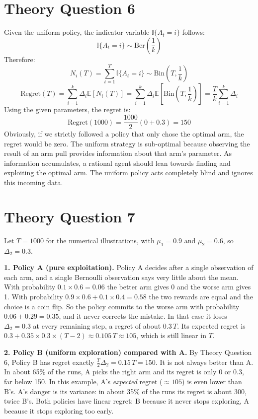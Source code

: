 \documentclass[12pt,a4paper]{article}
\begin{document}
\section*{Theory Question 6} %
Given the uniform policy, the indicator variable $\mathbb{I}\{A_t = i\}$ follows: %
\[
\mathbb{I}\{A_t = i\} \sim \mathrm{Ber}\left(\frac{1}{k}\right)
\] %
Therefore: %
\[
N_i(T) = \sum_{t=1}^T \mathbb{I}\{A_t = i\} \sim \mathrm{Bin}\left(T, \frac{1}{k}\right)
\] %
\[
\mathrm{Regret}(T) = \sum_{i=1}^k \Delta_i \mathbb{E}[N_i(T)] = \sum_{i=1}^k \Delta_i \mathbb{E}\left[\mathrm{Bin}\left(T, \frac{1}{k}\right)\right] = \frac{T}{k} \sum_{i=1}^k \Delta_i
\] %
Using the given parameters, the regret is: %
\[
\mathrm{Regret}(1000) = \frac{1000}{2} (0 + 0.3) = 150
\] %
Obviously, if we strictly followed a policy that only chose the optimal arm, the regret would be zero.
The uniform strategy is sub-optimal because observing the result of an arm pull provides information about that arm's parameter.
As information accumulates, a rational agent should lean towards finding and exploiting the optimal arm.
The uniform policy acts completely blind and ignores this incoming data.
%

\section*{Theory Question 7} %
Let $T=1000$ for the numerical illustrations, with $\mu_1 = 0.9$ and $\mu_2 = 0.6$, so $\Delta_2 = 0.3$.

\textbf{1. Policy A (pure exploitation).}
Policy A decides after a single observation of each arm, and a single Bernoulli observation says very little about the mean.
With probability $0.1 \times 0.6 = 0.06$ the better arm gives 0 and the worse arm gives 1.
With probability $0.9\times0.6 + 0.1\times0.4 = 0.58$ the two rewards are equal and the choice is a coin flip.
So the policy commits to the worse arm with probability $0.06 + 0.29 = 0.35$, and it never corrects the mistake.
In that case it loses $\Delta_2 = 0.3$ at every remaining step, a regret of about $0.3\,T$.
Its expected regret is $0.3 + 0.35 \times 0.3 \times (T-2) \approx 0.105\,T \approx 105$, which is still linear in $T$.

\textbf{2. Policy B (uniform exploration) compared with A.}
By Theory Question 6, Policy B has regret exactly $\frac{T}{2}\Delta_2 = 0.15\,T = 150$.
It is not always better than A. In about 65\% of the runs, A picks the right arm and its regret is only $0$ or $0.3$, far below 150.
In this example, A's \emph{expected} regret ($\approx 105$) is even lower than B's.
A's danger is its variance: in about 35\% of the runs its regret is about $300$, twice B's.
Both policies have linear regret: B because it never stops exploring, A because it stops exploring too early.
\end{document}
